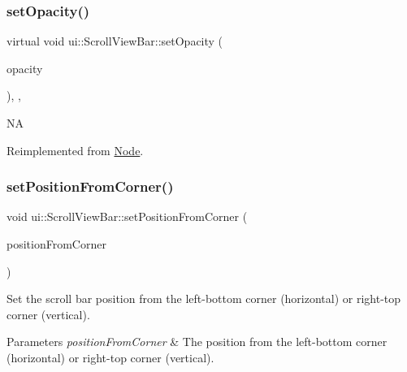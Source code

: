 \subsubsection{\texorpdfstring{set\+Opacity()}{setOpacity()}\hspace{0.1cm}{\footnotesize\ttfamily [2/2]}}
{\footnotesize\ttfamily virtual void ui\+::\+Scroll\+View\+Bar\+::set\+Opacity (\begin{DoxyParamCaption}\item[{G\+Lubyte}]{opacity }\end{DoxyParamCaption})\hspace{0.3cm}{\ttfamily [inline]}, {\ttfamily [override]}, {\ttfamily [virtual]}}

NA 

Reimplemented from \hyperlink{classNode_ae41a9db63bfa3d466ee7c9d79c35352d}{Node}.

\mbox{\label{classui_1_1ScrollViewBar_a89cb4e9250dbc32036e970c18b2c8c08}} 
\subsubsection{\texorpdfstring{set\+Position\+From\+Corner()}{setPositionFromCorner()}\hspace{0.1cm}{\footnotesize\ttfamily [1/2]}}
{\footnotesize\ttfamily void ui\+::\+Scroll\+View\+Bar\+::set\+Position\+From\+Corner (\begin{DoxyParamCaption}\item[{const \hyperlink{classVec2}{Vec2} \&}]{position\+From\+Corner }\end{DoxyParamCaption})}



Set the scroll bar position from the left-\/bottom corner (horizontal) or right-\/top corner (vertical). 


\begin{DoxyParams}{Parameters}
{\em position\+From\+Corner} & The position from the left-\/bottom corner (horizontal) or right-\/top corner (vertical). \\
\hline
\end{DoxyParams}
\mbox{\label{classui_1_1ScrollViewBar_a89cb4e9250dbc32036e970c18b2c8c08}} 
